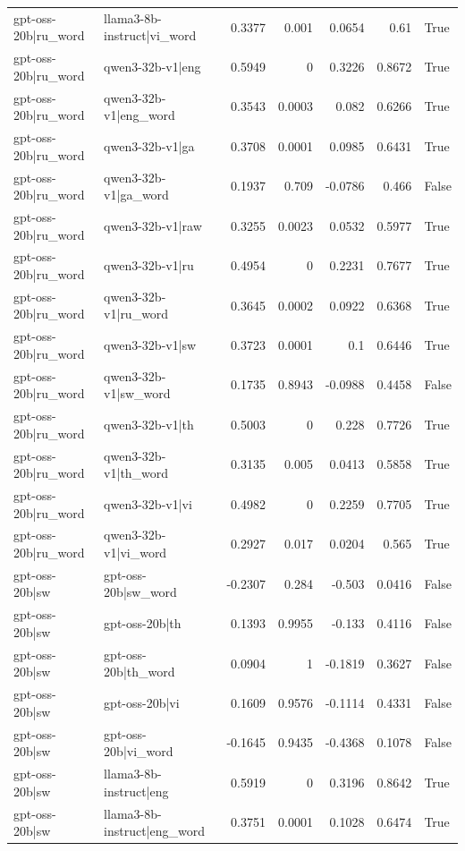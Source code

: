 \begin{table}
\begin{tabular}{l l r r r r l}
gpt-oss-20b|ru_word & llama3-8b-instruct|vi_word & 0.3377 & 0.001 & 0.0654 & 0.61 & True \\
gpt-oss-20b|ru_word & qwen3-32b-v1|eng & 0.5949 & 0 & 0.3226 & 0.8672 & True \\
gpt-oss-20b|ru_word & qwen3-32b-v1|eng_word & 0.3543 & 0.0003 & 0.082 & 0.6266 & True \\
gpt-oss-20b|ru_word & qwen3-32b-v1|ga & 0.3708 & 0.0001 & 0.0985 & 0.6431 & True \\
gpt-oss-20b|ru_word & qwen3-32b-v1|ga_word & 0.1937 & 0.709 & -0.0786 & 0.466 & False \\
gpt-oss-20b|ru_word & qwen3-32b-v1|raw & 0.3255 & 0.0023 & 0.0532 & 0.5977 & True \\
gpt-oss-20b|ru_word & qwen3-32b-v1|ru & 0.4954 & 0 & 0.2231 & 0.7677 & True \\
gpt-oss-20b|ru_word & qwen3-32b-v1|ru_word & 0.3645 & 0.0002 & 0.0922 & 0.6368 & True \\
gpt-oss-20b|ru_word & qwen3-32b-v1|sw & 0.3723 & 0.0001 & 0.1 & 0.6446 & True \\
gpt-oss-20b|ru_word & qwen3-32b-v1|sw_word & 0.1735 & 0.8943 & -0.0988 & 0.4458 & False \\
gpt-oss-20b|ru_word & qwen3-32b-v1|th & 0.5003 & 0 & 0.228 & 0.7726 & True \\
gpt-oss-20b|ru_word & qwen3-32b-v1|th_word & 0.3135 & 0.005 & 0.0413 & 0.5858 & True \\
gpt-oss-20b|ru_word & qwen3-32b-v1|vi & 0.4982 & 0 & 0.2259 & 0.7705 & True \\
gpt-oss-20b|ru_word & qwen3-32b-v1|vi_word & 0.2927 & 0.017 & 0.0204 & 0.565 & True \\
gpt-oss-20b|sw & gpt-oss-20b|sw_word & -0.2307 & 0.284 & -0.503 & 0.0416 & False \\
gpt-oss-20b|sw & gpt-oss-20b|th & 0.1393 & 0.9955 & -0.133 & 0.4116 & False \\
gpt-oss-20b|sw & gpt-oss-20b|th_word & 0.0904 & 1 & -0.1819 & 0.3627 & False \\
gpt-oss-20b|sw & gpt-oss-20b|vi & 0.1609 & 0.9576 & -0.1114 & 0.4331 & False \\
gpt-oss-20b|sw & gpt-oss-20b|vi_word & -0.1645 & 0.9435 & -0.4368 & 0.1078 & False \\
gpt-oss-20b|sw & llama3-8b-instruct|eng & 0.5919 & 0 & 0.3196 & 0.8642 & True \\
gpt-oss-20b|sw & llama3-8b-instruct|eng_word & 0.3751 & 0.0001 & 0.1028 & 0.6474 & True \\

\end{tabular}
\end{table}
